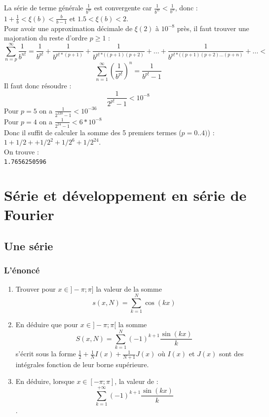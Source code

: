 \documentclass[a4paper,11pt]{book}
\begin{document}
La s\'erie de terme g\'en\'erale $\frac{1}{b^{n!}}$ est convergente car 
$\frac{1}{b^{n!}}<\frac{1}{b^{n}}$, donc :\\
$1+\frac{1}{b}<\xi(b)<\frac{b}{b-1}$ et $1.5<\xi(b)<2$.\\
Pour avoir une approximation d\'ecimale de $\xi(2)$ \`a 
$10^{-8}$ pr\`es, il faut trouver une majoration du reste d'ordre $p\geq 1$ :
$$\sum_{n=p}^\infty\frac{1}{b^{n!}}=
\frac{1}{b^{p!}}+\frac{1}{b^{p!*(p+1)}}+\frac{1}{b^{p!*((p+1)(p+2)}}+...+\frac{1}{b^{p!*((p+1)(p+2)...(p+n)}}+...<$$
$$\sum_{n=1}^\infty(\frac{1}{b^{p!}})^n=\frac{1}{b^{p!}-1}$$
Il faut donc r\'esoudre :
$$\frac{1}{2^{p!}-1}<10^{-8}$$
Pour $p=5$ on a $\frac{1}{2^{120}-1}<10^{-36}$\\
Pour $p=4$ on a $\frac{1}{2^{24}-1}<6*10^{-8}$\\
Donc il suffit de calculer la somme des 5 premiers termes ($p=0..4)$) :\\
$1+1/2++1/2^2+1/2^6+1/2^{24}$.\\
On trouve :\\
{\tt 1.7656250596}

\section{S\'erie et d\'eveloppement en s\'erie de Fourier}
\subsection{Une  s\'erie}
\subsubsection{L'\'enonc\'e}
\begin{enumerate}
\item Trouver pour $x\in]-\pi;\pi]$ la valeur de la somme 
$$s(x,N)=\sum_{k=1}^N\cos(kx)$$
\item En d\'eduire que pour $x\in]-\pi;\pi[$ la somme 
$$S(x,N)=\sum_{k=1}^N(-1)^{k+1}\frac{\sin(kx)}{k}$$
s'\'ecrit sous la forme $\frac{1}{2}+\frac{1}{N}I(x)+\frac{1}{N+1}J(x)$ o\`u $I(x)$ et  $J(x)$ sont des int\'egrales fonction de leur borne sup\'erieure.
\item En d\'eduire, lorsque $x\in[-\pi;\pi]$, la valeur de :
$$\sum_{k=1}^{+\infty}(-1)^{k+1}\frac{\sin(kx)}{k}$$.
\end{enumerate}
\end{document}
